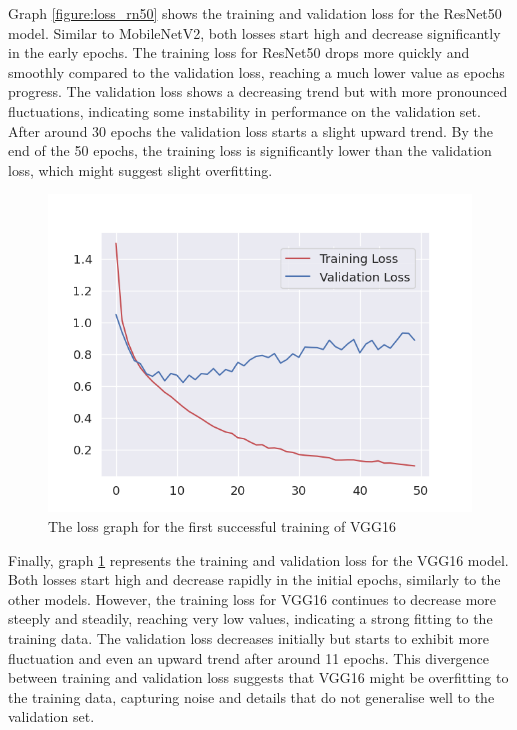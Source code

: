 Graph \ref{figure:loss_rn50} shows the training and validation loss for the ResNet50 model. Similar to MobileNetV2, both losses start high and decrease significantly in the early epochs. The training loss for ResNet50 drops more quickly and smoothly compared to the validation loss, reaching a much lower value as epochs progress. The validation loss shows a decreasing trend but with more pronounced fluctuations, indicating some instability in performance on the validation set. After around 30 epochs the validation loss starts a slight upward trend. By the end of the 50 epochs, the training loss is significantly lower than the validation loss, which might suggest slight overfitting.

\begin{figure}[H]
    \centering{}
    \includegraphics[scale=0.5]{fed_images/train_loss_VGG16.png}
    \caption{The loss graph for the first successful training of VGG16}
    \label{figure:loss_vgg16}
\end{figure}

Finally, graph \ref{figure:loss_vgg16} represents the training and validation loss for the VGG16 model. Both losses start high and decrease rapidly in the initial epochs, similarly to the other models. However, the training loss for VGG16 continues to decrease more steeply and steadily, reaching very low values, indicating a strong fitting to the training data. The validation loss decreases initially but starts to exhibit more fluctuation and even an upward trend after around 11 epochs. This divergence between training and validation loss suggests that VGG16 might be overfitting to the training data, capturing noise and details that do not generalise well to the validation set.


